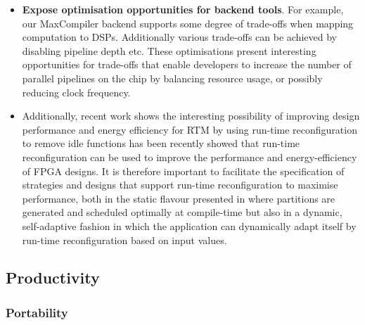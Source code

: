 \begin{itemize}
\item \textbf{Expose optimisation opportunities for backend
  tools}. For example, our MaxCompiler backend supports some degree of
  trade-offs when mapping computation to DSPs. Additionally various
  trade-offs can be achieved by disabling pipeline depth etc.  These
  optimisations present interesting opportunities for trade-offs that
  enable developers to increase the number of parallel pipelines on
  the chip by balancing resource usage, or possibly reducing clock
  frequency.

\item Additionally, recent work shows the interesting possibility of
  improving design performance and energy efficiency for RTM by using
  run-time reconfiguration to remove idle functions has been recently
  showed that run-time reconfiguration can be used to improve the
  performance and energy-efficiency of FPGA designs. It is therefore
  important to facilitate the specification of strategies and designs
  that support run-time reconfiguration to maximise performance, both
  in the static flavour presented in
  \cite{Xinyu:Qiwei:Luk:Qiang:Pell:2012} where partitions are
  generated and scheduled optimally at compile-time but also in a
  dynamic, self-adaptive fashion \cite{6322875} in which the
  application can dynamically adapt itself by run-time reconfiguration
  based on input values.

\end{itemize}



\subsection{Productivity}

\subsubsection{Portability}

